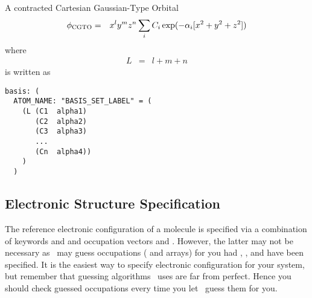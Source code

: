 A contracted Cartesian Gaussian-Type Orbital
\begin{eqnarray}
\phi_{\rm CGTO} & = & x^ly^mz^n\sum_i C_i \exp(-\alpha_i[x^2+y^2+z^2])
\end{eqnarray}
where
\begin{eqnarray}
L & = & l+m+n
\end{eqnarray}
is written as
\begin{verbatim}
basis: (
  ATOM_NAME: "BASIS_SET_LABEL" = (
    (L (C1  alpha1)
       (C2  alpha2)
       (C3  alpha3)
       ...
       (Cn  alpha4))   
    )
  )
\end{verbatim}

\subsection{Electronic Structure Specification}
The reference electronic configuration of a molecule is specified
via a combination of keywords  and 
and occupation vectors  and . However, the latter
may not be necessary as \PSIcscf\ may guess occupations (
and  arrays) for you
had , , and 
have been specified. It is the easiest way to specify electronic configuration
for your system, but remember that guessing algorithms \PSIcscf\ uses are
far from perfect. Hence you should check guessed occupations every time you
let \PSIcscf\ guess them for you.

